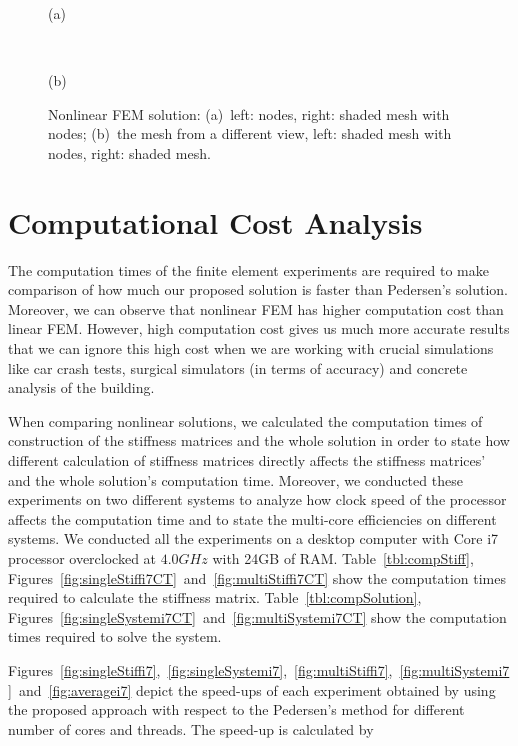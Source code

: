 \begin{figure}[h]
\centerline{}
\centerline{(a)}
\centerline{\ }
\centerline{}
\centerline{(b)}
\caption{Nonlinear FEM solution: (a)~left: nodes, right: shaded mesh with nodes; (b)~the mesh from a different view, left: shaded mesh with nodes, right: shaded mesh.}
\label{fig:fig40_41}
\end{figure}

\clearpage
\section{Computational Cost Analysis}

The computation times of the finite element experiments are required to make comparison of how much our proposed solution is faster than Pedersen's solution. Moreover, we can observe that nonlinear FEM has higher computation cost than linear FEM. However, high computation cost gives us much more accurate results that we can ignore this high cost when we are working with crucial simulations like car crash tests, surgical simulators (in terms of accuracy) and concrete analysis of the building.

When comparing nonlinear solutions, we calculated the computation times of construction of the stiffness matrices and the whole solution in order to state how different calculation of stiffness matrices directly affects the stiffness matrices' and the whole solution's computation time. Moreover, we conducted these experiments on two different systems to analyze how clock speed of the processor affects the computation time and to state the multi-core efficiencies on different systems. We conducted all the experiments on a desktop computer with Core i7 processor overclocked at $4.0GHz$ with 24GB of RAM. Table~\ref{tbl:compStiff}, Figures~\ref{fig:singleStiffi7CT}~and~\ref{fig:multiStiffi7CT} show the computation times required to calculate the stiffness matrix. Table~\ref{tbl:compSolution}, Figures~\ref{fig:singleSystemi7CT}~and~\ref{fig:multiSystemi7CT} show the computation times required to solve the system.



Figures~\ref{fig:singleStiffi7},~\ref{fig:singleSystemi7},~\ref{fig:multiStiffi7},~\ref{fig:multiSystemi7}~and~\ref{fig:averagei7} depict the speed-ups of each experiment obtained by using the proposed approach with respect to the Pedersen's method for different number of cores and threads. The speed-up is calculated by


